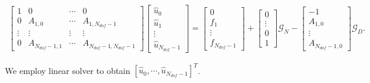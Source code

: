 \begin{eqnarray}
\begin{bmatrix}
    1       & 0         &\cdots     & 0   \\
    0       & A_{1,0}   &\cdots     & A_{1,N_{dof}-1}   \\
    \vdots  &\vdots     &\vdots     &\vdots        \\
    0       & A_{N_{dof}-1,1} &\cdots     & A_{N_{dof}-1,N_{dof}-1}
\end{bmatrix}
\begin{bmatrix}
    \hat u_0    \\
    \hat u_1    \\
    \vdots      \\
    \hat u_{N_{dof}-1}
\end{bmatrix}
=
\begin{bmatrix}
    0       \\
    f_1     \\
    \vdots  \\
    f_{N_{dof}-1}
\end{bmatrix}
+
\begin{bmatrix}
    0       \\
    \vdots  \\
    0       \\
    1
\end{bmatrix}
\mathcal{G}_N
-
\begin{bmatrix}
    -1       \\
    A_{1,0}  \\
    \vdots   \\
    A_{N_{dof}-1,0}
\end{bmatrix}
\mathcal{G}_D.
\end{eqnarray}

We employ linear solver to obtain $[\hat u_0, \cdots, \hat
u_{N_{dof}-1}]^T$.
